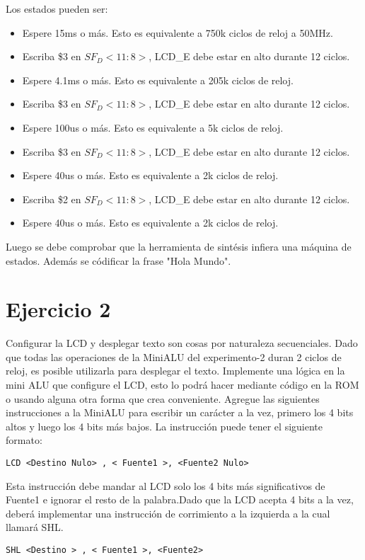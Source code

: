 \documentclass[10pt]{article}
\begin{document}
Los estados pueden ser:
\begin{itemize}
\item Espere 15ms o más. Esto es equivalente a 750k ciclos de reloj a 50MHz.
\item Escriba \$3 en $SF_D<11:8>$, LCD\_E debe estar en alto durante 12 ciclos.
\item Espere 4.1ms o más. Esto es equivalente a 205k ciclos de reloj.
\item Escriba \$3 en $SF_D<11:8>$, LCD\_E debe estar en alto durante 12 ciclos.
\item Espere 100us o más. Esto es equivalente a 5k ciclos de reloj.
\item Escriba \$3 en $SF_D<11:8>$, LCD\_E debe estar en alto durante 12 ciclos.
\item Espere 40us o más. Esto es equivalente a 2k ciclos de reloj.
\item Escriba \$2 en $SF_D<11:8>$, LCD\_E debe estar en alto durante 12 ciclos.
\item Espere 40us o más. Esto es equivalente a 2k ciclos de reloj.
\end{itemize}
Luego se debe comprobar que la herramienta de sintésis infiera una máquina de estados. Además se códificar la frase "Hola Mundo".


\newpage
\section*{Ejercicio 2}
Configurar la LCD y desplegar texto son cosas por naturaleza secuenciales. Dado que todas las operaciones de la MiniALU del experimento-2 duran 2 ciclos de reloj, es posible
utilizarla para desplegar el texto.
Implemente una lógica en la mini ALU que configure el LCD, esto lo podrá hacer mediante código en la ROM o usando alguna otra forma que crea conveniente.
Agregue las siguientes instrucciones a la MiniALU para escribir un carácter a la vez, primero los 4 bits altos y luego los 4 bits más bajos.
La instrucción puede tener el siguiente formato:

\begin{lstlisting}
LCD <Destino Nulo> , < Fuente1 >, <Fuente2 Nulo>
\end{lstlisting}
Esta instrucción debe mandar al LCD solo los 4 bits más significativos de Fuente1 e ignorar el resto  de la palabra.Dado que la LCD acepta 
4 bits a la vez, deberá implementar una instrucción de corrimiento a la izquierda a la cual llamará SHL.
\begin{lstlisting}
SHL <Destino > , < Fuente1 >, <Fuente2>
\end{lstlisting}
\end{document}
